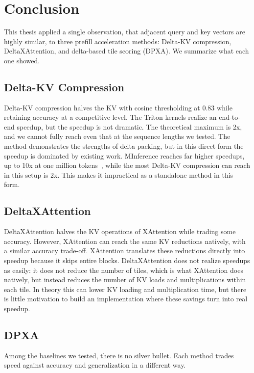 \section{Conclusion}

This thesis applied a single observation, that adjacent query and key vectors are highly similar, to three prefill acceleration methods: Delta-KV compression, DeltaXAttention, and delta-based tile scoring (DPXA). We summarize what each one showed.

\subsection{Delta-KV Compression}
Delta-KV compression halves the KV with cosine thresholding at 0.83 while retaining accuracy at a competitive level. The Triton kernels realize an end-to-end speedup, but the speedup is not dramatic. The theoretical maximum is 2x, and we cannot fully reach even that at the sequence lengths we tested. The method demonstrates the strengths of delta packing, but in this direct form the speedup is dominated by existing work. MInference reaches far higher speedups, up to 10x at one million tokens~\citep[Figure~1b]{jiang2024minference}, while the most Delta-KV compression can reach in this setup is 2x. This makes it impractical as a standalone method in this form.

\subsection{DeltaXAttention}
DeltaXAttention halves the KV operations of XAttention while trading some accuracy. However, XAttention can reach the same KV reductions natively, with a similar accuracy trade-off. XAttention translates these reductions directly into speedup because it skips entire blocks. DeltaXAttention does not realize speedups as easily: it does not reduce the number of tiles, which is what XAttention does natively, but instead reduces the number of KV loads and multiplications within each tile. In theory this can lower KV loading and multiplication time, but there is little motivation to build an implementation where these savings turn into real speedup.

\subsection{DPXA}

Among the baselines we tested, there is no silver bullet. Each method trades speed against accuracy and generalization in a different way.

